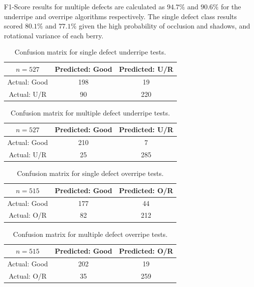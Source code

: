 \documentclass[fleqn,twoside]{article}
\begin{document}
F1-Score results for multiple defects are calculated as $94.7\%$ and $90.6\%$ for the underripe and overripe algorithms respectively. The single defect class results scored $80.1\%$ and $77.1\%$ given the high probability of occlusion and shadows, and rotational variance of each berry.


\begin{table}
	\centering
	\caption{Confusion matrix for single defect underripe tests.}
	\label{tab:confusion_1}
	\begin{tabular}{ccc}
		\toprule
		$n=527$ & Predicted: Good & Predicted: U/R  \\ 
		\midrule
		Actual: Good   & 198 & 19    \\[6pt] 
		Actual: U/R	   & 90  & 220  \\[6pt] 
		\bottomrule
	\end{tabular}
\end{table}

\begin{table}
	\centering
	\caption{Confusion matrix for multiple defect underripe tests.}
	\label{tab:confusion_2}
	\begin{tabular}{ccc}
		\toprule
		$n=527$ & Predicted: Good & Predicted: U/R  \\ 
		\midrule
		Actual: Good   & 210 & 7    \\[6pt] 
		Actual: U/R	   & 25  & 285  \\[6pt] 
		\bottomrule
	\end{tabular}
\end{table}

\begin{table}
	\centering
	\caption{Confusion matrix for single defect overripe tests.}
	\label{tab:confusion_3}
	\begin{tabular}{ccc}
		\toprule
		$n=515$ & Predicted: Good & Predicted: O/R  \\ 
		\midrule
		Actual: Good   & 177 & 44    \\[6pt] 
		Actual: O/R	   & 82  & 212  \\[6pt] 
		\bottomrule
	\end{tabular}
\end{table}

\begin{table}
	\centering
	\caption{Confusion matrix for multiple defect overripe tests.}
	\label{tab:confusion_4}
	\begin{tabular}{ccc}
		\toprule
		$n=515$ & Predicted: Good & Predicted: O/R  \\ 
		\midrule
		Actual: Good   & 202 & 19    \\[6pt] 
		Actual: O/R	   & 35  & 259  \\[6pt] 
		\bottomrule
	\end{tabular}
\end{table}
\end{document}
